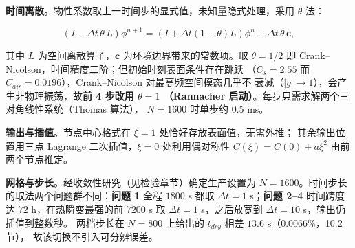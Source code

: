 \textbf{时间离散}。物性系数取上一时间步的显式值，未知量隐式处理，采用
$\theta$ 法：

\begin{equation}
\left(I-\Delta t\,\theta\,L\right)\phi^{n+1}
=\left(I+\Delta t(1-\theta)L\right)\phi^{n}+\Delta t\,\theta\,\mathbf{c},
\end{equation}

其中 $L$ 为空间离散算子，$\mathbf{c}$ 为环境边界带来的常数项。取
$\theta=1/2$ 即 Crank--Nicolson，时间精度二阶；但初始时刻表面条件存在跳跃
（$C_s=2.55$ 而 $C_{air}=0.0196$），Crank--Nicolson 对最高频空间模态几乎不
衰减（$|g|\to1$），会产生非物理振荡，故\textbf{前 4 步改用 $\theta=1$
（Rannacher 启动）}。每步只需求解两个三对角线性系统（Thomas 算法），
$N=1600$ 时单步约 0.5 ms。

\textbf{输出与插值}。节点中心格式在 $\xi=1$ 处恰好存放表面值，无需外推；
其余输出位置用三点 Lagrange 二次插值，$\xi=0$ 处利用偶对称性
$C(\xi)=C(0)+a\xi^2$ 由前两个节点推定。

\textbf{网格与步长}。经收敛性研究（见检验章节）确定生产设置为
$N=1600$。时间步长的取法两个问题群不同：\textbf{问题 1} 全程 $1800$ s 都取
$\Delta t=1$ s；\textbf{问题 2--4} 时间跨度达 $72$ h，在热瞬变最强的前 $7200$ s
取 $\Delta t=1$ s，之后放宽到 $\Delta t=10$ s，输出仍插值到整数秒。
两档步长在 $N=800$ 上给出的 $t_{dry}$ 相差 $13.6$ s（$0.0066\%$，10.2 节），
故该切换不引入可分辨误差。
